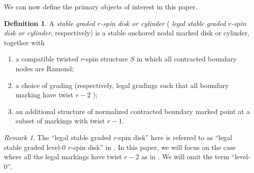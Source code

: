 \documentclass[11pt]{amsart}
\theoremstyle{definition}
\newtheorem{definition}[dummy]{Definition}
\theoremstyle{remark}
\newtheorem{rmk}[dummy]{Remark}
\newcommand{\<}{\left<}
\renewcommand{\>}{\right>}
\numberwithin{equation}{section}
\begin{document}
We can now define the primary objects of interest in %
this paper.

\begin{definition}
\label{def graded rspin disk}
A %
\textit{stable graded $r$-spin disk or cylinder} ( \textit{legal stable graded $r$-spin disk or cylinder}, respectively) is a stable anchored nodal marked disk or %
cylinder, together with
\begin{enumerate}
\item a compatible twisted $r$-spin structure $S$ in which all contracted boundary nodes are Ramond;
\item a choice of grading (respectively, legal gradings such that all boundary marking have twist $r-2$ );

\item  an additional structure of normalized contracted boundary marked point at a subset of markings with twist $r-1$.

\end{enumerate}
\end{definition}

\begin{rmk}
   The ``legal stable graded $r$-spin disk'' here is referred to as ``legal stable graded level-$0$ $r$-spin disk'' in \cite{TZ1,TZ2}. In %
this paper, we %
will focus on the case where all the legal markings have twist $r-2$ as in \cite{BCT2}. We will omit the term %
``level-$0$''.
\end{rmk}
\end{document}
